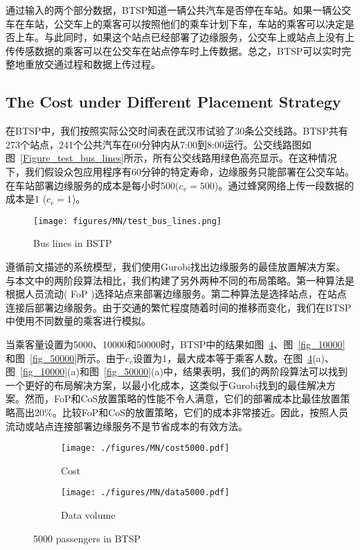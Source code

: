 通过输入的两个部分数据，BTSP知道一辆公共汽车是否停在车站。如果一辆公交车在车站，公交车上的乘客可以按照他们的乘车计划下车，车站的乘客可以决定是否上车。与此同时，如果这个站点已经部署了边缘服务，公交车上或站点上没有上传传感数据的乘客可以在公交车在站点停车时上传数据。总之，BTSP可以实时完整地重放交通过程和数据上传过程。

\subsection{The Cost under Diﬀerent Placement Strategy}

在BTSP中，我们按照实际公交时间表在武汉市试验了30条公交线路。BTSP共有273个站点，241个公共汽车在60分钟内从7:00到8:00运行。公交线路图如图~\ref{Figure_test_bus_lines}所示，所有公交线路用绿色高亮显示。在这种情况下，我们假设众包应用程序有60分钟的特定寿命，边缘服务只能部署在公交车站。在车站部署边缘服务的成本是每小时500($c_v = 500$)。通过蜂窝网络上传一段数据的成本是1 ($c_c = 1$)。

\begin{figure}[!h]
\centering
\vspace{-1em}
\texttt{[image: figures/MN/test\_bus\_lines.png]}
\vspace{-0.5em}
\caption{Bus lines in BSTP}
\label{Figure_test_bus_lines 用白底图}
\end{figure}

遵循前文描述的系统模型，我们使用Gurobi找出边缘服务的最佳放置解决方案。与本文中的两阶段算法相比，我们构建了另外两种不同的布局策略。第一种算法是根据人员流动( FoP )选择站点来部署边缘服务。第二种算法是选择站点，在站点连接后部署边缘服务。由于交通的繁忙程度随着时间的推移而变化，我们在BTSP中使用不同数量的乘客进行模拟。

当乘客量设置为5000、10000和50000时，BTSP中的结果如图~\ref{fig_5000}、图~\ref{fig_10000}和图~\ref{fig_50000}所示。由于$c_c$设置为1，最大成本等于乘客人数。在图~\ref{fig_5000}(a)、图~\ref{fig_10000}(a)和图~\ref{fig_50000}(a)中，结果表明，我们的两阶段算法可以找到一个更好的布局解决方案，以最小化成本，这类似于Gurobi找到的最佳解决方案。然而，FoP和CoS放置策略的性能不令人满意，它们的部署成本比最佳放置策略高出20\%。比较FoP和CoS的放置策略，它们的成本非常接近。因此，按照人员流动或站点连接部署边缘服务不是节省成本的有效方法。

\begin{figure}[!h]
  \centering
  \begin{subfigure}[b]{0.45\linewidth}
    \texttt{[image: ./figures/MN/cost5000.pdf]}
    \label{fig_cost5000}
    \caption{Cost}
  \end{subfigure}
  \begin{subfigure}[b]{0.45\linewidth}
    \texttt{[image: ./figures/MN/data5000.pdf]}
    \label{fig_data5000}
    \caption{Data volume}
  \end{subfigure}
  \caption{5000 passengers in BTSP}
  \label{fig_5000}
\end{figure}

